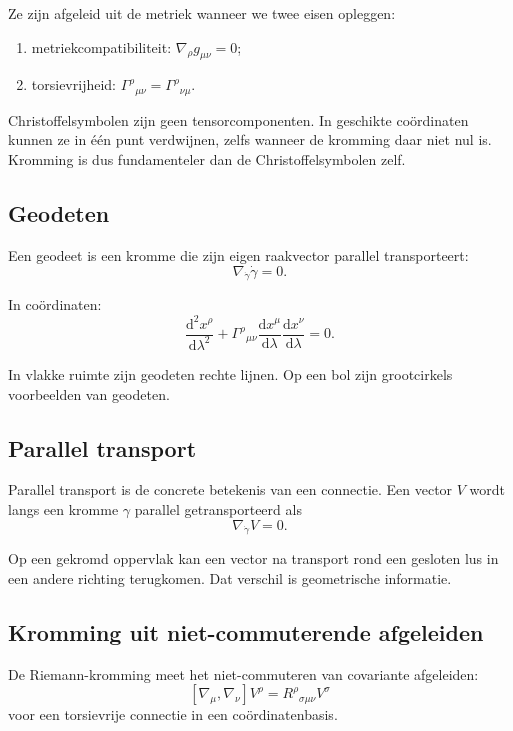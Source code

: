 \documentclass[11pt,a4paper]{article}
\newcommand{\dd}{\mathrm{d}}
\begin{document}
Ze zijn afgeleid uit de metriek wanneer we twee eisen opleggen:
\begin{enumerate}
    \item metriekcompatibiliteit: $\nabla_\rho g_{\mu\nu}=0$;
    \item torsievrijheid: $\Gamma^\rho{}_{\mu\nu}=\Gamma^\rho{}_{\nu\mu}$.
\end{enumerate}

\begin{waarschuwing}
Christoffelsymbolen zijn geen tensorcomponenten. In geschikte coördinaten kunnen ze in één punt verdwijnen, zelfs wanneer de kromming daar niet nul is. Kromming is dus fundamenteler dan de Christoffelsymbolen zelf.
\end{waarschuwing}

\subsection{Geodeten}

Een geodeet is een kromme die zijn eigen raakvector parallel transporteert:
\[
\nabla_{\dot\gamma}\dot\gamma=0.
\]

In coördinaten:
\[
\frac{\dd^2x^\rho}{\dd\lambda^2}
+\Gamma^\rho{}_{\mu\nu}
\frac{\dd x^\mu}{\dd\lambda}
\frac{\dd x^\nu}{\dd\lambda}=0.
\]

In vlakke ruimte zijn geodeten rechte lijnen. Op een bol zijn grootcirkels voorbeelden van geodeten.

\subsection{Parallel transport}

Parallel transport is de concrete betekenis van een connectie. Een vector $V$ wordt langs een kromme $\gamma$ parallel getransporteerd als
\[
\nabla_{\dot\gamma}V=0.
\]

Op een gekromd oppervlak kan een vector na transport rond een gesloten lus in een andere richting terugkomen. Dat verschil is geometrische informatie.

\subsection{Kromming uit niet-commuterende afgeleiden}

De Riemann-kromming meet het niet-commuteren van covariante afgeleiden:
\[
[\nabla_\mu,\nabla_\nu]V^\rho
=R^\rho{}_{\sigma\mu\nu}V^\sigma
\]
voor een torsievrije connectie in een coördinatenbasis.
\end{document}
